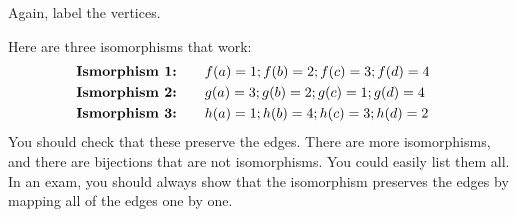 \begin{questions}
  \begin{solution}
    Again, label the vertices.
      \begin{center}
        \hspace{1.5cm}
      \end{center}
      Here are three isomorphisms that work:
      \begin{align*}
      &\textbf{\textrm{Ismorphism 1:}} \qquad f(a) = 1; f(b) = 2; f(c) = 3; f(d) = 4& \\
      &\textbf{\textrm{Ismorphism 2:}} \qquad g(a) = 3; g(b) = 2; g(c) = 1; g(d) = 4& \\
      &\textbf{\textrm{Ismorphism 3:}} \qquad h(a) = 1; h(b) = 4; h(c) = 3; h(d) = 2&
      \end{align*}
      You should check that these preserve the edges.
      There are more isomorphisms, and there are bijections that are not isomorphisms.
      You could easily list them all.
      In an exam, you should always show that the isomorphism preserves the edges by mapping all of the edges one by one.
  \end{solution}



\end{questions}
